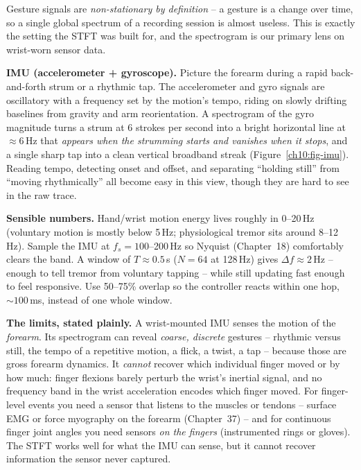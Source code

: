 \begin{goalbox}
Gesture signals are \emph{non-stationary by definition} -- a gesture is a change
over time, so a single global spectrum of a recording session is almost useless.
This is exactly the setting the STFT was built for, and the spectrogram is our
primary lens on wrist-worn sensor data.

\textbf{IMU (accelerometer + gyroscope).} Picture the forearm during a rapid back-and-forth
strum or a rhythmic tap. The accelerometer and gyro signals are oscillatory with
a frequency set by the motion's tempo, riding on slowly drifting baselines from
gravity and arm reorientation. A spectrogram of the gyro magnitude turns a strum
at 6 strokes per second into a bright horizontal line at $\approx 6$\,Hz that
\emph{appears when the strumming starts and vanishes when it stops}, and a single
sharp tap into a clean vertical broadband streak (Figure~\ref{ch10:fig-imu}).
Reading tempo, detecting onset
and offset, and separating ``holding still'' from ``moving rhythmically'' all
become easy in this view, though they are hard to see in the raw trace.

\textbf{Sensible numbers.} Hand/wrist motion energy lives roughly in 0--20\,Hz
(voluntary motion is mostly below 5\,Hz; physiological tremor sits around
8--12\,Hz). Sample the IMU at $f_s = 100$--200\,Hz so Nyquist (Chapter~18)
comfortably clears the band. A window of $T \approx 0.5$\,s ($N = 64$ at 128\,Hz)
gives $\Delta f \approx 2$\,Hz -- enough to tell tremor from voluntary tapping --
while still updating fast enough to feel responsive. Use 50--75\% overlap so the
controller reacts within one hop, $\sim 100$\,ms, instead of one whole window.

\textbf{The limits, stated plainly.} A wrist-mounted IMU senses the motion of the
\emph{forearm}. Its spectrogram can reveal \emph{coarse, discrete}
gestures -- rhythmic versus still, the tempo of a repetitive motion, a flick, a
twist, a tap -- because those are gross forearm dynamics. It \emph{cannot} recover
which individual finger moved or by how much: finger flexions barely perturb the
wrist's inertial signal, and no frequency band in the wrist acceleration encodes
which finger moved. For finger-level events you need a sensor that listens to the
muscles or tendons -- surface EMG or force myography on the forearm
(Chapter~37) -- and for continuous finger joint angles you need sensors
\emph{on the fingers} (instrumented rings or gloves). The STFT works well
for what the IMU can sense, but it cannot recover information the sensor
never captured.
\end{goalbox}

